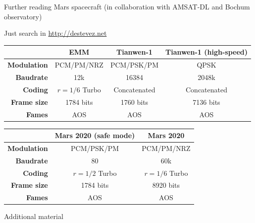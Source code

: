 \documentclass[aspectratio=169]{beamer}
\begin{document}
\begin{frame}{Further reading}
  Mars spacecraft (in collaboration with AMSAT-DL and Bochum observatory)
  
  Just search in \url{http://destevez.net}
  
  \begin{center}
  \begin{tabular}{r | c | c | c }
    & {\bf EMM } & {\bf Tianwen-1} & {\bf Tianwen-1 (high-speed)} \\
    \hline
    {\bf Modulation} & PCM/PM/NRZ & PCM/PSK/PM & QPSK \\
    {\bf Baudrate} & 12k & 16384 &  2048k\\
    {\bf Coding} & $r = 1/6$ Turbo & Concatenated &  Concatenated \\
    {\bf Frame size} & 1784 bits & 1760 bits &  7136 bits \\
    {\bf Fames} & AOS & AOS &  AOS\\
  \end{tabular}
  \end{center}
  \begin{center}
  \begin{tabular}{r | c | c}
    & {\bf Mars 2020 (safe mode)} & {\bf Mars 2020} \\
    \hline
    {\bf Modulation} & PCM/PSK/PM & PCM/PM/NRZ \\
    {\bf Baudrate} & 80 & 60k \\
    {\bf Coding} & $r = 1/2$ Turbo & $r = 1/6$ Turbo \\
    {\bf Frame size} & 1784 bits & 8920 bits \\
    {\bf Fames} & AOS & AOS \\
  \end{tabular}
  \end{center}
\end{frame}

\begin{frame}
  \begin{block}{}
    \begin{center}
      \vspace{1em}
      {\huge Additional material}
      \vspace{1em}
    \end{center}
  \end{block}
\end{frame}
\end{document}
